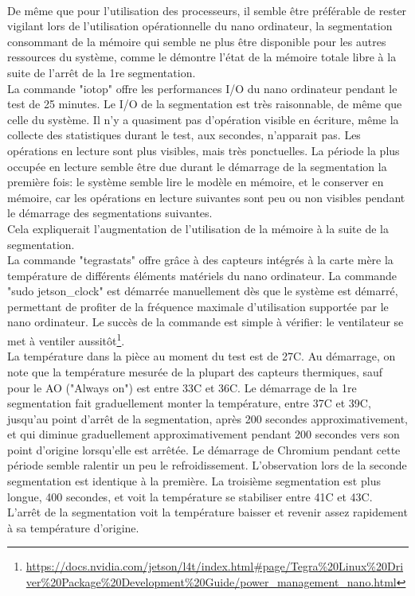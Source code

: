 \vspace{\baselineskip}
\\
\noindent De même que pour l'utilisation des processeurs, il semble être préférable de rester vigilant lors de l'utilisation opérationnelle du nano ordinateur, la segmentation consommant de la mémoire qui semble ne plus être disponible pour les autres ressources du système, comme le démontre l'état de la mémoire totale libre à la suite de l'arrêt de la 1re segmentation. 
\vspace{\baselineskip}
\\
\noindent La commande "iotop" offre les performances I/O du nano ordinateur pendant le test de 25 minutes. Le I/O de la segmentation est très raisonnable, de même que celle du système. Il n'y a quasiment pas d'opération visible en écriture, même la collecte des statistiques durant le test, aux secondes, n'apparait pas. Les opérations en lecture sont plus visibles, mais très ponctuelles. La période la plus occupée en lecture semble être due durant le démarrage de la segmentation la première fois: le système semble lire le modèle en mémoire, et le conserver en mémoire, car les opérations en lecture suivantes sont peu ou non visibles pendant le démarrage des segmentations suivantes.
\vspace{\baselineskip}
\\
\noindent Cela expliquerait l'augmentation de l'utilisation de la mémoire à la suite de la segmentation. 
\vspace{\baselineskip}
\\
\noindent La commande "tegrastats" offre grâce à des capteurs intégrés à la carte mère la température de différents éléments matériels du nano ordinateur. La commande "sudo jetson\_clock" est démarrée manuellement dès que le système est démarré, permettant de profiter de la fréquence maximale d'utilisation supportée par le nano ordinateur. Le  succès de la commande est simple à vérifier: le ventilateur se met à ventiler aussitôt\footnote{\url{https://docs.nvidia.com/jetson/l4t/index.html#page/Tegra\%20Linux\%20Driver\%20Package\%20Development\%20Guide/power_management_nano.html}}.
\vspace{\baselineskip}
\\
\noindent La température dans la pièce au moment du test est de 27C. Au démarrage, on note que la température mesurée de la plupart des capteurs thermiques, sauf pour le AO ("Always on") est entre 33C et 36C. Le démarrage de la 1re segmentation fait graduellement monter la température, entre 37C et 39C, jusqu'au point d'arrêt de la segmentation, après 200 secondes approximativement, et qui diminue graduellement approximativement pendant 200 secondes vers son point d'origine lorsqu'elle est arrêtée. Le démarrage de Chromium pendant cette période semble ralentir un peu le refroidissement. L'observation lors de la seconde segmentation est identique à la première. La troisième segmentation est plus longue, 400 secondes, et voit la température se stabiliser entre 41C et 43C. L'arrêt de la segmentation voit la température baisser et revenir assez rapidement à sa température d'origine. 
